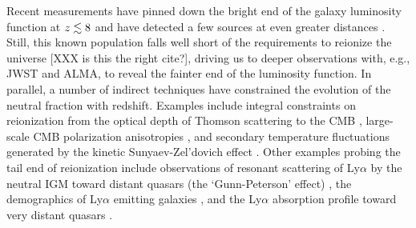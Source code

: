 \documentclass[twocolumn,numberedappendix]{emulateapj} \shorttitle{PSA64}
\begin{document}
Recent measurements
have pinned down the bright end of the galaxy luminosity function
at $z \lesssim 8$ \citep{bouwens_et_al2010,schenker_et_al2013} and have detected a few sources at even greater
distances \citep{ellis_et_al2013,oesch_et_al2013}. Still, this known population falls well short 
of the requirements to reionize the universe \citep{robertson_et_al2013} [XXX is this the right cite?], 
driving us to deeper observations with, e.g., JWST and ALMA, to reveal the fainter end of the luminosity function.
In parallel, a number of indirect techniques have constrained the evolution of the neutral fraction
with redshift. Examples include integral constraints on reionization from the
optical depth of Thomson scattering to the CMB \citep{planck_et_al2013},
large-scale CMB polarization anisotropies \citep{page_et_al2007}, and
secondary temperature fluctuations generated by the kinetic Sunyaev-Zel'dovich effect \citep{zahn_et_al2012,mesinger_et_al2012}.
Other examples probing the tail end of reionization include
observations of resonant scattering of Ly$\alpha$ by the neutral IGM toward
distant quasars (the `Gunn-Peterson' effect) \citep{fan_et_al2006},
the demographics of Ly$\alpha$ emitting galaxies \citep{schenker_et_al2013,treu_et_al2013,Faisst_et_al2014},
and the
Ly$\alpha$ absorption profile toward very distant quasars \citep{bolton_et_al2011}.

\end{document}
